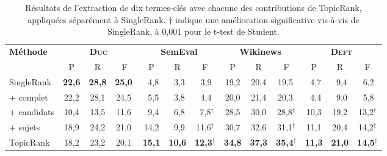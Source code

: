         \begin{table}
          \centering
          \begin{tabular}{l|c@{~~}c@{~~}c@{~}|c@{~~}c@{~~}c@{~}|c@{~~}c@{~~}c@{~}|c@{~~}c@{~~}c@{~}}
            \toprule
            \multirow{2}{*}[-2pt]{\textbf{Méthode}} & \multicolumn{3}{c|}{\textbf{\textsc{Duc}}} & \multicolumn{3}{c|}{\textbf{SemEval}} & \multicolumn{3}{c|}{\textbf{Wikinews}} & \multicolumn{3}{c}{\textbf{\textsc{Deft}}}\\
            \cline{2-4}\cline{5-7}\cline{8-10}\cline{11-13}
            & P & R & F & P & R & F & P & R & F & P & R & F\\
            \hline
            SingleRank & \textbf{22,6} & \textbf{28,8} & \textbf{25,0}$^{~}$ & $~~$4,8 & $~~$3,3 & $~~$3,9$^{~}$ & 19,2 & 20,4 & 19,5$^{~}$ & $~~$4,7 & $~~$9,4 & $~~$6,2$^{~}$\\
            + complet & 22,2 & 28,1 & 24,5$^{~}$ & $~~$5,5 & $~~$3,8 & $~~$4,4$^{~}$ & 20,0 & 21,4 & 20,3${~}$ & $~~$4,4 & $~~$9,0 & $~~$5,8$^{~}$\\
            + candidats & 10,4 & 13,5 & 11,6$^{~}$ & $~~$9,4 & $~~$6,8 & $~~$7,8$^\dagger$ & 28,5 & 30,0 & 28,8$^\dagger$ & 10,3 & 19,2 & 13,2$^\dagger$\\
            + sujets & 18,9 & 24,2 & 21,0$^{~}$ & 14,2 & $~~$9,9 & 11,6$^\dagger$ & 30,7 & 32,6 & 31,1$^\dagger$ & 11,1 & 20,4 & 14,2$^\dagger$\\
            TopicRank & 18,2 & 23,2 & 20,1$^{~}$ & \textbf{15,1} & \textbf{10,6} & \textbf{12,3}$^\dagger$ & \textbf{34,8} & \textbf{37,3} & \textbf{35,4}$^\dagger$ & \textbf{11,3} & \textbf{21,0} & \textbf{14,5}$^\dagger$\\
            \bottomrule
          \end{tabular}
          \caption[Résultats de l'extraction de dix termes-clés avec chacune des
                   contributions de TopicRank, appliquées séparément à
                   SingleRank]{
            Résultats de l'extraction de dix termes-clés avec chacune des
            contributions de TopicRank, appliquées séparément à SingleRank.
            $\dagger$ indique une amélioration significative vis-à-vis de
            SingleRank, à 0,001 pour le t-test de Student.
            \label{tab:evaluation_individuelle_des_ameliorations}
          }
        \end{table}

